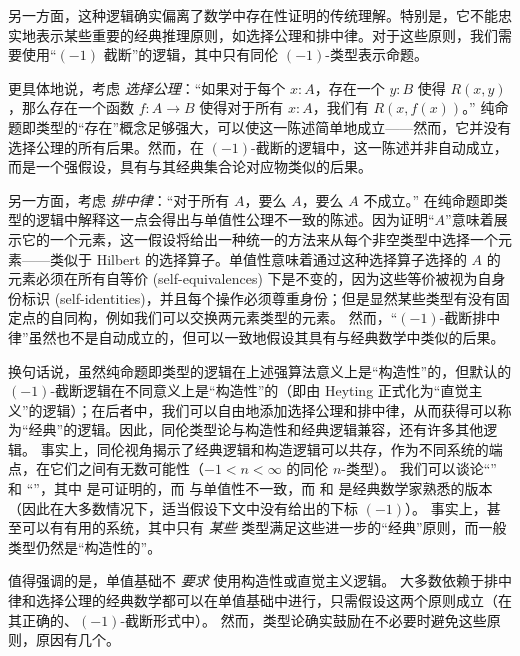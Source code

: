 另一方面，这种逻辑确实偏离了数学中存在性证明的传统理解。特别是，它不能忠实地表示某些重要的经典推理原则，如选择公理和排中律。对于这些原则，我们需要使用“$(-1)$ 截断”的逻辑，其中只有同伦 $(-1)$-类型表示命题。

%
更具体地说，考虑 \emph{选择公理}：“如果对于每个 $x: A$，存在一个 $y:B$ 使得 $R(x,y)$，那么存在一个函数 $f : A\to B$ 使得对于所有 $x:A$，我们有 $R(x, f(x))$。”
纯命题即类型的“存在”概念足够强大，可以使这一陈述简单地成立——然而，它并没有选择公理的所有后果。然而，在 $(-1)$-截断的逻辑中，这一陈述并非自动成立，而是一个强假设，具有与其经典集合论对应物类似的后果。

另一方面，考虑 \emph{排中律}：“对于所有 $A$，要么 $A$，要么 $A$ 不成立。”
在纯命题即类型的逻辑中解释这一点会得出与单值性公理不一致的陈述。因为证明“$A$”意味着展示它的一个元素，这一假设将给出一种统一的方法来从每个非空类型中选择一个元素——类似于 Hilbert 的选择算子。单值性意味着通过这种选择算子选择的 $A$ 的元素必须在所有自等价 (self-equivalences) 下是不变的，因为这些等价被视为自身份标识 (self-identities)，并且每个操作必须尊重身份；但是显然某些类型有没有固定点的自同构，例如我们可以交换两元素类型的元素。
然而，“$(-1)$-截断排中律”虽然也不是自动成立的，但可以一致地假设其具有与经典数学中类似的后果。

换句话说，虽然纯命题即类型的逻辑在上述强算法意义上是“构造性”的，但默认的 $(-1)$-截断逻辑在不同意义上是“构造性”的（即由 Heyting 正式化为“直觉主义”的逻辑）；在后者中，我们可以自由地添加选择公理和排中律，从而获得可以称为“经典”的逻辑。因此，同伦类型论与构造性和经典逻辑兼容，还有许多其他逻辑。
事实上，同伦视角揭示了经典逻辑和构造逻辑可以共存，作为不同系统的端点，在它们之间有无数可能性（$-1 < n < \infty$ 的同伦 $n$-类型）。
我们可以谈论“” 和 “”，其中 \choice{\infty} 是可证明的，而 \LEM{\infty} 与单值性不一致，而  和  是经典数学家熟悉的版本（因此在大多数情况下，适当假设下文中没有给出的下标 $(-1)$）。
事实上，甚至可以有有用的系统，其中只有 \emph{某些} 类型满足这些进一步的“经典”原则，而一般类型仍然是“构造性的”。%

值得强调的是，单值基础不 \emph{要求} 使用构造性或直觉主义逻辑。
大多数依赖于排中律和选择公理的经典数学都可以在单值基础中进行，只需假设这两个原则成立（在其正确的、$(-1)$-截断形式中）。
然而，类型论确实鼓励在不必要时避免这些原则，原因有几个。

